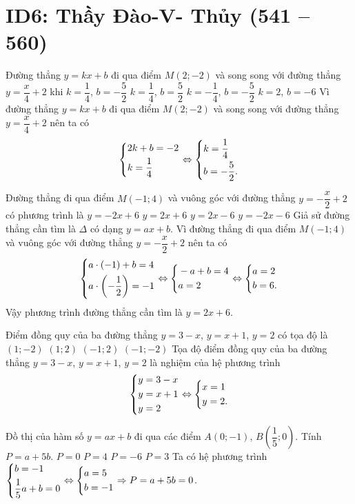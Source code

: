 \section*{ID6: Thầy Đào-V- Thủy (541 -- 560)}
\begin{ex}%
	Đường thẳng $y=kx+b$ đi qua điểm $M(2;-2)$ và song song với đường thẳng $y=\dfrac{x}{4}+2$ khi
	\choice
	{\True $k=\dfrac{1}{4}$, $b=-\dfrac{5}{2}$}
	{$k=\dfrac{1}{4}$, $b=\dfrac{5}{2}$}
	{$k=-\dfrac{1}{4}$, $b=-\dfrac{5}{2}$}
	{$k=2$, $b=-6$}
	\loigiai
	{
		Vì đường thẳng $y=kx+b$ đi qua điểm $M(2;-2)$ và song song với đường thẳng $y=\dfrac{x}{4}+2$ nên ta có
		\[\left\{\begin{aligned}&2k+b=-2\\&k=\dfrac{1}{4}\end{aligned}\right.\Leftrightarrow \left\{\begin{aligned}&k=\dfrac{1}{4}\\ &b=-\dfrac{5}{2}.\end{aligned}\right.\]
	}
\end{ex}

\begin{ex}%
	Đường thẳng đi qua điểm $M(-1;4)$ và vuông góc với đường thẳng $y=-\dfrac{x}{2}+2$ có phương trình là
	\choice
	{$y=-2x+6$}
	{\True $y=2x+6$}
	{$y=2x-6$}
	{$y=-2x-6$}
	\loigiai
	{
		Giả sử đường thẳng cần tìm là $\Delta$ có dạng $y=ax+b$. Vì đường thẳng đi qua điểm $M(-1;4)$ và vuông góc với đường thẳng $y=-\dfrac{x}{2}+2$ nên ta có 
		\[\left\{\begin{aligned}&a\cdot (-1)+b=4\\ &a\cdot \left(-\dfrac{1}{2}\right)=-1\end{aligned}\right.\Leftrightarrow \left\{\begin{aligned}&-a+b=4\\ &a=2\end{aligned}\right.\Leftrightarrow \left\{\begin{aligned}&a=2\\ &b=6.\end{aligned}\right.\]
		Vậy phương trình đường thẳng cần tìm là $y=2x+6$.
	}
\end{ex}

\begin{ex}%
	Điểm đồng quy của ba đường thẳng $y=3-x$, $y=x+1$, $y=2$ có tọa độ là
	\choice
	{$(1;-2)$}
	{\True $(1;2)$}
	{$(-1;2)$}
	{$(-1;-2)$}
	\loigiai
	{
		Tọa độ điểm đồng quy của  ba đường thẳng $y=3-x$, $y=x+1$, $y=2$ là nghiệm của hệ phương trình
		\[\left\{\begin{aligned}&y=3-x\\ &y=x+1\\ &y=2\end{aligned}\right.\Leftrightarrow \left\{\begin{aligned}&x=1\\ &y=2.\end{aligned}\right.\]
	}
\end{ex}

\begin{ex}%
	Đồ thị của hàm số $ y=ax+b $ đi qua các điểm $ A(0;-1)$, $B\left(\dfrac{1}{5};0 \right) $. Tính $ P=a+5b$.
	\choice
	{\True $P=0$}
	{$P=4$}
	{$P=-6$}
	{$P=3$}
	\loigiai
	{
		Ta có hệ phương trình $\left\{\begin{aligned}&b=-1\\&\dfrac{1}{5}a+b=0\end{aligned}\right. \Leftrightarrow \left\{\begin{aligned}&a=5\\&b=-1\end{aligned}\right. \Rightarrow P=a+5b=0$.
	}
\end{ex}

